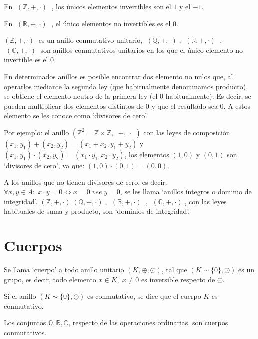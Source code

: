 \begin{ejem}
En $\;(\mathbb Z, +, \cdot )\;$	, los únicos elementos invertibles son el $1$ y el $-1$.

En $\;(\mathbb R, +, \cdot )\;$	, el único elementos no invertibles es el $0$.

$(\mathbb Z, +, \cdot )\;$	es un anillo conmutativo unitario, $\;(\mathbb Q, +, \cdot )\;$, 	$\;(\mathbb R, +, \cdot )\;$	, $\;(\mathbb C, +, \cdot )\;$	son anillos conmutativos unitarios en los que el único elemento no invertible es el $0$

En determinados anillos es posible encontrar dos elemento no nulos que, al operarlos mediante la segunda ley (que habitualmente denominamos producto), se obtiene el elemento neutro de la primera ley (el $0$ habitualmente). Es decir, se pueden multiplicar dos elementos distintos de $0$ y que el resultado sea $0$. A estos elemento se les conoce como `divisores de cero'. 

Por ejemplo: el anillo $(\mathbb Z^2=\mathbb Z \times \mathbb Z,\;  \; +,\;   \cdot \; )$ con las leyes de composición $(x_1,y_1)+(x_2,y_2)=(x_1+x_2, y_1+y_2)$ y $(x_1,y_1)\cdot (x_2,y_2)=(x_1\cdot y_1, x_2\cdot y_2)$, los elementos $(1,0)$ y $(0,1)$ son `divisores de cero', ya que: $(1,0)\cdot (0,1)=(0,0)$.

A los anillos que no tienen divisores de cero, es decir: $\forall x,y \in A: \; x \cdot y =0 \Leftrightarrow x=0 \; vee \; y=0$, se les llama `anillos íntegros o dominio de integridad'. $(\mathbb Z, +, \cdot )\;(\mathbb Q, +, \cdot )\;$, 	$\;(\mathbb R, +, \cdot )\;$	, $\;(\mathbb C, +, \cdot )\;$, con las leyes habituales de suma y producto, son `dominios de integridad'.
\end{ejem}



\section{Cuerpos}
\begin{defi}
Se llama `cuerpo' a todo anillo unitario $(K,\oplus,\odot)$, tal que $(K\sim\{0\},\odot)$ es un grupo, es decir, todo elemento $x\in K, \; x\neq 0$ es inversible respecto de $\odot$.

Si el anillo $(K\sim\{0\},\odot)$ es conmutativo, se dice que el cuerpo $K$ es conmutativo.
\end{defi}
\begin{ejem}
Los conjuntos $\mathbb Q, \mathbb R, \mathbb C$, respecto de las operaciones ordinarias, son cuerpos conmutativos.	
\end{ejem}

